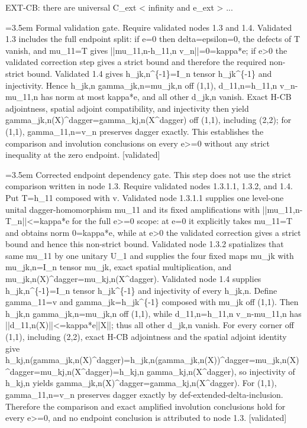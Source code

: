 \documentclass{article}
\newcommand{\step}[1]{\par\noindent\hangindent=3.5em\hangafter=1%
  \makebox[3.5em][l]{\textbf{#1.}}}
\newcommand{\steptag}[1]{\hfill{\small\textsf{[#1]}}}
\begin{document}
\begin{proofbox}{EXT-CB: there are universal C\_ext < infinity and e\_ext > ...}
\step{1.5.1.1.1.1} Formal validation gate. Require validated nodes 1.3 and 1.4. Validated 1.3 includes the full endpoint split: if e=0 then delta=epsilon=0, the defects of T vanish, and mu\_11=T gives ||mu\_11,n-h\_11,n v\_n||=0=kappa*e; if e>0 the validated correction step gives a strict bound and therefore the required non-strict bound. Validated 1.4 gives h\_jk,n\textasciicircum{}\{-1\}=I\_n tensor h\_jk\textasciicircum{}\{-1\} and injectivity. Hence h\_jk,n gamma\_jk,n=mu\_jk,n off (1,1), d\_11,n=h\_11,n v\_n-mu\_11,n has norm at most kappa*e, and all other d\_jk,n vanish. Exact H-CB adjointness, spatial adjoint compatibility, and injectivity then yield gamma\_jk,n(X)\textasciicircum{}dagger=gamma\_kj,n(X\textasciicircum{}dagger) off (1,1), including (2,2); for (1,1), gamma\_11,n=v\_n preserves dagger exactly. This establishes the comparison and involution conclusions on every e>=0 without any strict inequality at the zero endpoint. \steptag{validated} \\[4pt]
\step{1.5.1.1.1.2} Corrected endpoint dependency gate. This step does not use the strict comparison written in node 1.3. Require validated nodes 1.3.1.1, 1.3.2, and 1.4. Put T=h\_11 composed with v. Validated node 1.3.1.1 supplies one level-one unital dagger-homomorphism mu\_11 and its fixed amplifications with ||mu\_11,n-T\_n||<=kappa*e for the full e>=0 scope: at e=0 it explicitly takes mu\_11=T and obtains norm 0=kappa*e, while at e>0 the validated correction gives a strict bound and hence this non-strict bound. Validated node 1.3.2 spatializes that same mu\_11 by one unitary U\_1 and supplies the four fixed maps mu\_jk with mu\_jk,n=I\_n tensor mu\_jk, exact spatial multiplication, and mu\_jk,n(X)\textasciicircum{}dagger=mu\_kj,n(X\textasciicircum{}dagger). Validated node 1.4 supplies h\_jk,n\textasciicircum{}\{-1\}=I\_n tensor h\_jk\textasciicircum{}\{-1\} and injectivity of every h\_jk,n. Define gamma\_11=v and gamma\_jk=h\_jk\textasciicircum{}\{-1\} composed with mu\_jk off (1,1). Then h\_jk,n gamma\_jk,n=mu\_jk,n off (1,1), while d\_11,n=h\_11,n v\_n-mu\_11,n has ||d\_11,n(X)||<=kappa*e||X||; thus all other d\_jk,n vanish. For every corner off (1,1), including (2,2), exact H-CB adjointness and the spatial adjoint identity give h\_kj,n(gamma\_jk,n(X)\textasciicircum{}dagger)=h\_jk,n(gamma\_jk,n(X))\textasciicircum{}dagger=mu\_jk,n(X)\textasciicircum{}dagger=mu\_kj,n(X\textasciicircum{}dagger)=h\_kj,n gamma\_kj,n(X\textasciicircum{}dagger), so injectivity of h\_kj,n yields gamma\_jk,n(X)\textasciicircum{}dagger=gamma\_kj,n(X\textasciicircum{}dagger). For (1,1), gamma\_11,n=v\_n preserves dagger exactly by def-extended-delta-inclusion. Therefore the comparison and exact amplified involution conclusions hold for every e>=0, and no endpoint conclusion is attributed to node 1.3. \steptag{validated} \\[4pt]

\end{proofbox}
\end{document}
